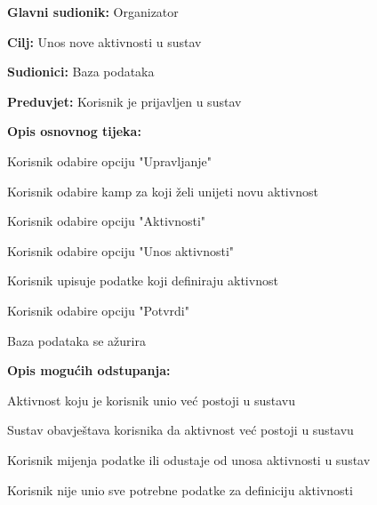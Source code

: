 					\noindent {}
					\begin{packed_item}
						
						\item \textbf{Glavni sudionik: }Organizator
						\item  \textbf{Cilj:} Unos nove aktivnosti u sustav
						\item  \textbf{Sudionici:} Baza podataka
						\item  \textbf{Preduvjet:} Korisnik je prijavljen u sustav
						\item  \textbf{Opis osnovnog tijeka:}
						
						\item[] \begin{packed_enum}
							
							\item Korisnik odabire opciju "Upravljanje"
							\item Korisnik odabire kamp za koji želi unijeti novu aktivnost
							\item Korisnik odabire opciju "Aktivnosti"
							\item Korisnik odabire opciju "Unos aktivnosti"
							\item Korisnik upisuje podatke koji definiraju aktivnost
							\item Korisnik odabire opciju "Potvrdi"
							\item Baza podataka se ažurira
						\end{packed_enum}
						
						\item  \textbf{Opis mogućih odstupanja:}
						
						\item[] \begin{packed_item}
							
							\item[2.a] Aktivnost koju je korisnik unio već postoji u sustavu
							\item[] \begin{packed_enum}
								
							\item Sustav obavještava korisnika da aktivnost već postoji u sustavu
							\item Korisnik mijenja podatke ili odustaje od unosa aktivnosti u sustav
							
								
							\end{packed_enum}
							\item[2.b] Korisnik nije unio sve potrebne podatke za definiciju aktivnosti
							\item[] \begin{packed_enum}
								

\end{packed_enum}
\end{packed_item}
\end{packed_item}
